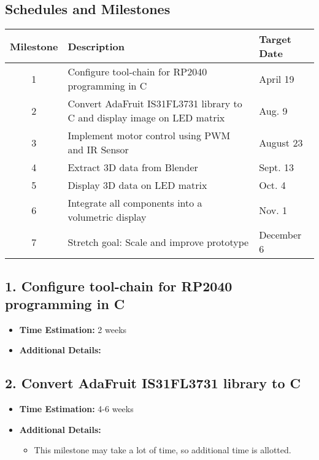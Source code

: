 \documentclass[11pt,journal]{IEEEtran}
\begin{document}
\subsection{Schedules and Milestones}


\begin{table}[h]
\centering
\begin{tabular}{|c|p{3cm}|p{3cm}|}
\hline
\textbf{Milestone} & \textbf{Description} & \textbf{Target Date} \\
\hline
1 & Configure tool-chain for RP2040 programming in C & April 19 \\
\hline
2 & Convert AdaFruit IS31FL3731 library to C and display image on LED matrix & Aug. 9 \\
\hline
3 & Implement motor control using PWM and IR Sensor & August 23 \\
\hline
4 & Extract 3D data from Blender & Sept. 13 \\
\hline
5 & Display 3D data on LED matrix & Oct. 4 \\
\hline
6 & Integrate all components into a volumetric display & Nov. 1 \\
\hline
7 & Stretch goal: Scale and improve prototype & December 6 \\
\hline
\end{tabular}
\end{table}

\subsection*{1. Configure tool-chain for RP2040 programming in C}
\begin{itemize}
  \item \textbf{Time Estimation:} 2 weeks
  \item \textbf{Additional Details:} 
\end{itemize}

\subsection*{2. Convert AdaFruit IS31FL3731 library to C}
\begin{itemize}
  \item \textbf{Time Estimation:} 4-6 weeks
  \item \textbf{Additional Details:} 
  \begin{itemize}
    \item This milestone may take a lot of time, so additional time is allotted.
  \end{itemize}
\end{itemize}
\end{document}
